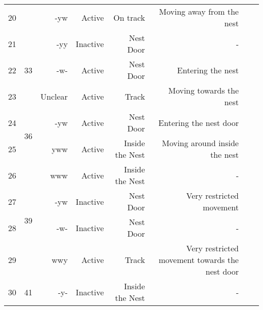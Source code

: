 \documentclass{scrartcl}
\begin{document}
\begin{adjustwidth}{-2.5 cm}{-2.5 cm}
\begin{threeparttable}[!htb]
\begin{tabular}{lrrrrrrr}
20 & &-yw &Active &On track &Moving away from the nest & \\
21 &\multirow{3}{*}{33} &-yy &Inactive &Nest Door &- & \\
22 & &-w- &Active &Nest Door &Entering the nest & \\
23 & &Unclear &Active &Track &Moving towards the nest & \\
24 &\multirow{2}{*}{36} &-yw &Active &Nest Door &Entering the nest door & \\
25 & &yww &Active &Inside the Nest &Moving around inside the nest & \\
26 &\multirow{4}{*}{39} &www &Active &Inside the Nest &- & \\
27 & &-yw &Inactive &Nest Door &Very restricted movement & \\
28 & &-w- &Inactive &Nest Door &- & \\
29 & &wwy &Active &Track &Very restricted movement towards the nest door & \\
30 &41 &-y- &Inactive &Inside the Nest &- & \\
\bottomrule
\end{tabular}
\end{threeparttable}
\end{adjustwidth}
\newpage
\end{document}
